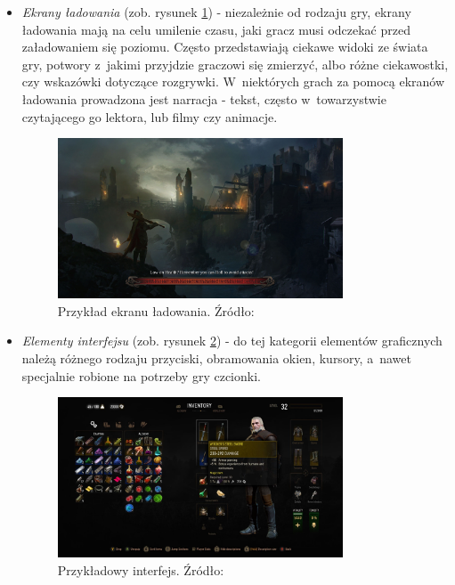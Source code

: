 \documentclass[12pt,a4paper,oneside]{book}
\theoremstyle{definition}
\numberwithin{equation}{chapter}
\begin{document}
\begin{itemize}
\item \textit{Ekrany ładowania} (zob. rysunek \ref{LoadingScreen}) - niezależnie od rodzaju gry, ekrany ładowania mają na celu umilenie czasu, jaki gracz musi odczekać przed załadowaniem się poziomu. Często przedstawiają ciekawe widoki ze świata gry, potwory z~jakimi przyjdzie graczowi się zmierzyć, albo różne ciekawostki, czy wskazówki dotyczące rozgrywki. W~niektórych grach za pomocą ekranów ładowania prowadzona jest narracja - tekst, często w~towarzystwie czytającego go lektora, lub filmy czy animacje.

\begin{figure}[hpt!]
        \centering
        \includegraphics[width=0.8\textwidth]{images/loadSCR.jpg}
        \caption{Przykład ekranu ładowania. Źródło: \cite{loadSCR}}
        \label{LoadingScreen}
\end{figure}

\item \textit{Elementy interfejsu} (zob. rysunek \ref{Interface}) - do tej kategorii elementów graficznych należą różnego rodzaju przyciski, obramowania okien, kursory, a~nawet specjalnie robione na potrzeby gry czcionki.

\begin{figure}[hpt!]
        \centering
        \includegraphics[width=0.8\textwidth]{images/interface.jpg}
        \caption{Przykładowy interfejs. Źródło: \cite{interface}}
        \label{Interface}
\end{figure}

\end{itemize}
\end{document}
